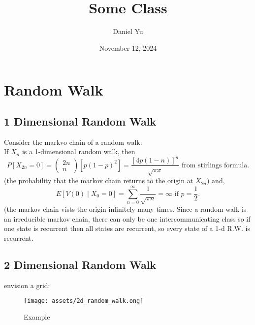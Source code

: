 \documentclass[a4paper]{article}
\title{\Huge{Some Class}}
\author{\huge{Daniel Yu}}
\date{November 12, 2024}
\begin{document}
\maketitle
\newpage%
\tableofcontents
\pagebreak
\section{Random Walk}
\subsection{1 Dimensional Random Walk}
Consider the markvo chain of a random walk: \\
If $X_n$ is a 1-dimensional random walk, then
 \[
   P[X_{2n} =0] = \begin{pmatrix} 2n \\ n \end{pmatrix} [p(1-p)^{2}] = \frac{[4 p (1-n)]^{n}}{\sqrt{\pi x} } \text{ from stirlings formula}
.\]
(the probability that the markov chain returns to the origin at $X_{2n}$)
and,
\[
  E[V(0) \mid X_0 = 0] = \sum_{n=0}^{\infty} \frac{1}{\sqrt{\pi n} } = \infty \text{ if $p = \frac{1}{2}$}
.\] 
(the markov chain vists the origin infinitely many times. Since a random walk is an irreducible markov chain, there can only be one intercommunicating class so if one state is recurrent then all states are recurrent, so every state of a 1-d R.W. is recurrent.

\subsection{2 Dimensional Random Walk}
envision a grid:

\begin{figure}[h]
  \centering
  \texttt{[image: assets/2d\_random\_walk.ong]}
  \caption{Example}
  \label{fig:2d_random_walk}
\end{figure}
\end{document}
